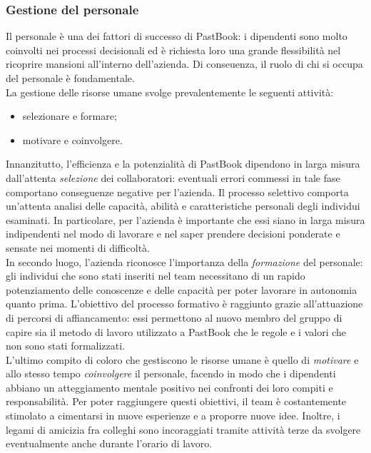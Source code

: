 			\subsubsection{Gestione del personale}
				Il personale è una dei fattori di successo di PastBook: i dipendenti sono molto coinvolti nei processi decisionali
				ed è richiesta loro una grande flessibilità nel ricoprire mansioni all'interno dell'azienda. Di conseuenza, il ruolo
				di chi si occupa del personale è fondamentale.\\
				La gestione delle risorse umane svolge prevalentemente le seguenti attività:
				\begin{itemize}
					\item selezionare e formare;
					\item motivare e coinvolgere.
				\end{itemize}
				Innanzitutto, l'efficienza e la potenzialità di PastBook dipendono in larga misura dall'attenta \emph{selezione} dei
				collaboratori: eventuali errori commessi in tale fase comportano conseguenze negative per l'azienda. Il processo
				selettivo comporta un'attenta analisi delle capacità, abilità e caratteristiche personali degli individui esaminati.
				In particolare, per l'azienda è importante che essi siano in larga misura indipendenti nel modo di lavorare e nel
				saper prendere decisioni ponderate e sensate nei momenti di difficoltà.\\
				In secondo luogo, l'azienda riconosce l'importanza della \emph{formazione} del personale: gli individui che sono
				stati inseriti nel team necessitano di un rapido potenziamento delle conoscenze e delle capacità per poter lavorare
				in autonomia quanto prima. L'obiettivo del processo formativo è raggiunto grazie all'attuazione di percorsi di
				affiancamento: essi permettono al nuovo membro del gruppo di capire sia il metodo di lavoro utilizzato a PastBook che
				le regole e i valori che non sono stati formalizzati.\\
				L'ultimo compito di coloro che gestiscono le risorse umane è quello di \emph{motivare} e allo stesso tempo
				\emph{coinvolgere} il personale, facendo in modo che i dipendenti abbiano un atteggiamento mentale positivo nei
				confronti dei loro compiti e responsabilità. Per poter raggiungere questi obiettivi, il team è costantemente
				stimolato a cimentarsi in nuove esperienze e a proporre nuove idee. Inoltre, i legami di amicizia fra colleghi sono
				incoraggiati tramite attività terze da svolgere eventualmente anche durante l'orario di lavoro.
